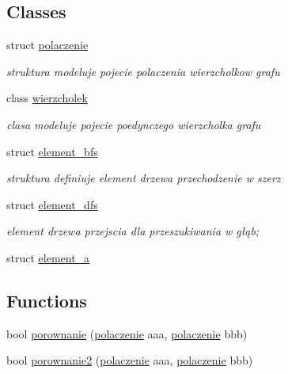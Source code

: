 \subsection*{\-Classes}
\begin{DoxyCompactItemize}
\item 
struct \hyperlink{structpolaczenie}{polaczenie}
\begin{DoxyCompactList}\small\item\em struktura modeluje pojecie polaczenia wierzcholkow grafu \end{DoxyCompactList}\item 
class \hyperlink{classwierzcholek}{wierzcholek}
\begin{DoxyCompactList}\small\item\em clasa modeluje pojecie poedynczego wierzcholka grafu \end{DoxyCompactList}\item 
struct \hyperlink{structelement__bfs}{element\-\_\-bfs}
\begin{DoxyCompactList}\small\item\em struktura definiuje element drzewa przechodzenie w szerz \end{DoxyCompactList}\item 
struct \hyperlink{structelement__dfs}{element\-\_\-dfs}
\begin{DoxyCompactList}\small\item\em element drzewa przejscia dla przeszukiwania w głąb; \end{DoxyCompactList}\item 
struct \hyperlink{structelement__a}{element\-\_\-a}
\end{DoxyCompactItemize}
\subsection*{\-Functions}
\begin{DoxyCompactItemize}
\item 
bool \hyperlink{wierzcholek_8hh_abf7cee761b1201166cbe397d8723789a}{porownanie} (\hyperlink{structpolaczenie}{polaczenie} aaa, \hyperlink{structpolaczenie}{polaczenie} bbb)
\item 
bool \hyperlink{wierzcholek_8hh_a0b7a1f69efe292898e8aa9e44e0ed658}{porownanie2} (\hyperlink{structpolaczenie}{polaczenie} aaa, \hyperlink{structpolaczenie}{polaczenie} bbb)
\end{DoxyCompactItemize}


